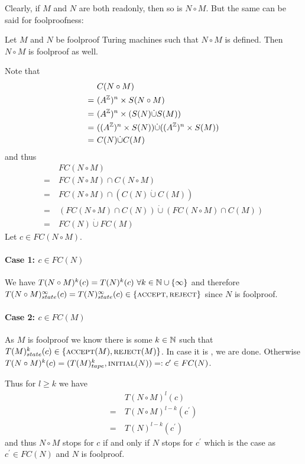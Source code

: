 Clearly, if $M$ and $N$ are both readonly, then so is $N \circ M$. But the same can be said for foolproofness:

\begin{Lemma} \label{turing_machines:lemma_foolproof_concatenation:lemma}
	Let $M$ and $N$ be foolproof Turing machines such that $N \circ M$ is defined. Then $N \circ M$ is foolproof as well.
\end{Lemma}
\proof
Note that
\begin{align*}
	&C(N \circ M) \\
	=~&(A^{\mathbb{Z}})^n \times S(N \circ M) \\
	=~&(A^{\mathbb{Z}})^n \times (S(N) \dot\cup S(M)) \\
	=~&((A^{\mathbb{Z}})^n \times S(N)) \dot\cup ((A^{\mathbb{Z}})^n \times S(M)) \\
	=~&C(N) \dot\cup C(M)
\end{align*}
and thus
\begin{align*}
	&FC(N \circ M) \\
	=~&FC(N \circ M) \cap C(N \circ M) \\
	=~&FC(N \circ M) \cap (C(N) \dot\cup C(M)) \\
	=~&(FC(N \circ M) \cap C(N)) \dot\cup (FC(N \circ M) \cap C(M)) \\
	=~&FC(N) \dot\cup FC(M)
\end{align*}
Let $c \in FC(N \circ M)$.
\paragraph{Case 1: $c \in FC(N)$}
We have
$T(N \circ M)^k (c) = T(N)^k (c) ~\forall k \in \mathbb{N} \cup \{\infty\}$
and therefore $T(N \circ M)_{state}^\infty(c) = T(N)_{state}^\infty(c) \in \{\text{\scshape{accept}},\text{\scshape{reject}}\}$
since $N$ is foolproof.
\paragraph{Case 2: $c \in FC(M)$}
As $M$ is foolproof we know there is some $k \in \mathbb{N}$ such that $T(M)_{state}^k(c) \in \{\text{\scshape{accept}}(M),\text{\scshape{reject}}(M)\}$.
In case it is \REJ, we are done.
Otherwise $T(N \circ M)^k(c) = (T(M)_{tape}^k,\text{\scshape{initial}}(N)) =: c^\prime \in FC(N)$.

Thus for $l \geq k$ we have
\begin{align*}
	&T(N \circ M)^l(c) \\
	=~&T(N \circ M)^{l-k}(c^\prime) \\
	=~&T(N)^{l-k}(c^\prime)
\end{align*}
and thus $N \circ M$ stops for $c$ if and only if $N$ stops for $c^\prime$ which is the case as $c^\prime \in FC(N)$ and $N$ is foolproof.
\endproof
